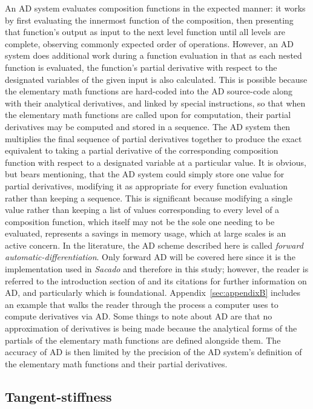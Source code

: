 \documentclass[preprint,12pt]{elsarticle}
\begin{document}
An AD system evaluates composition functions in the expected manner: it works
by first evaluating the innermost function of the composition, then presenting
that function's output as input to the next level function until all levels are
complete, observing commonly expected order of operations. However, an AD
system does additional work during a function evaluation in that as each nested
function is evaluated, the function's partial derivative with respect to the
designated variables of the given input is also calculated.  This is possible
because the elementary math functions are hard-coded into the AD source-code
along with their analytical derivatives, and linked by special instructions, so
that when the elementary math functions are called upon for computation, their
partial derivatives may be computed and stored in a sequence. The AD system
then multiplies the final sequence of partial derivatives together to produce
the exact equivalent to taking a partial derivative of the corresponding
composition function with respect to a designated variable at a particular
value. It is obvious, but bears mentioning, that the AD system could simply
store one value for partial derivatives, modifying it as appropriate for every
function evaluation rather than keeping a sequence. This is significant because
modifying a single value rather than keeping a list of values corresponding to
every level of a composition function, which itself may not be the sole one
needing to be evaluated, represents a savings in memory usage, which at large
scales is an active concern. In the literature, the AD scheme described here is
called \emph{forward automatic-differentiation}. Only forward AD will be
covered here since it is the implementation used in \emph{Sacado} and therefore
in this study; however, the reader is referred to the introduction section of
\cite{ref-AD-methods} and its citations for further information on AD, and
particularly \cite{ref-on-AD} which is foundational.
Appendix~\ref{sec:appendixB} includes an example that walks the reader through
the process a computer uses to compute derivatives via AD.  Some things to note
about AD are that no approximation of derivatives is being made because the
analytical forms of the partials of the elementary math functions are defined
alongside them. The accuracy of AD is then limited by the precision of the AD
system's definition of the elementary math functions and their partial
derivatives.
 
\subsection{Tangent-stiffness} 
\end{document}
